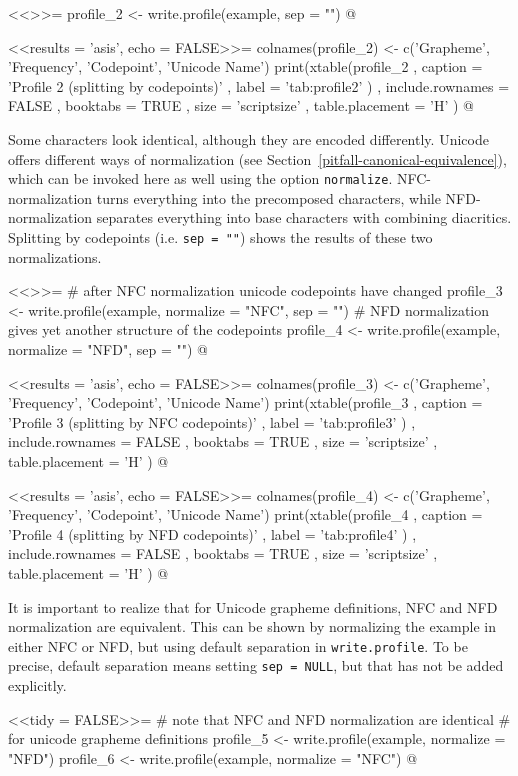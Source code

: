 <<>>=
profile_2 <- write.profile(example, sep = "")
@

<<results = 'asis', echo = FALSE>>=
colnames(profile_2) <- c('Grapheme', 'Frequency', 'Codepoint', 'Unicode Name')
print(xtable(profile_2
        , caption = 'Profile 2 (splitting by codepoints)'
        , label = 'tab:profile2'
        )
  , include.rownames = FALSE
  , booktabs = TRUE
  , size = 'scriptsize'
  , table.placement = 'H'
  )
@

Some characters look identical, although they are encoded differently.
Unicode offers different ways of normalization (see
Section~\ref{pitfall-canonical-equivalence}), which can be invoked here as well
using the option \texttt{normalize}. NFC-normalization turns everything into the
precomposed characters, while NFD-normalization separates everything into base
characters with combining diacritics. Splitting by codepoints (i.e. \texttt{sep~=~""}) shows the results of these two normalizations.

<<>>=
# after NFC normalization unicode codepoints have changed
profile_3 <- write.profile(example, normalize = "NFC", sep = "")
# NFD normalization gives yet another structure of the codepoints
profile_4 <- write.profile(example, normalize = "NFD", sep = "")
@

<<results = 'asis', echo = FALSE>>=
colnames(profile_3) <- c('Grapheme', 'Frequency', 'Codepoint', 'Unicode Name')
print(xtable(profile_3
        , caption = 'Profile 3 (splitting by NFC codepoints)'
        , label = 'tab:profile3'
        )
  , include.rownames = FALSE
  , booktabs = TRUE
  , size = 'scriptsize'
  , table.placement = 'H'
  )
@

<<results = 'asis', echo = FALSE>>=
colnames(profile_4) <- c('Grapheme', 'Frequency', 'Codepoint', 'Unicode Name')
print(xtable(profile_4
        , caption = 'Profile 4 (splitting by NFD codepoints)'
        , label = 'tab:profile4'
        )
  , include.rownames = FALSE
  , booktabs = TRUE
  , size = 'scriptsize'
  , table.placement = 'H'
  )
@

It is important to realize that for Unicode grapheme definitions, NFC
and NFD normalization are equivalent. This can be shown by normalizing the
example in either NFC or NFD, but using default separation in
\texttt{write.profile}. To be precise, default separation means setting
\texttt{sep~=~NULL}, but that has not be added explicitly.

<<tidy = FALSE>>=
# note that NFC and NFD normalization are identical
# for unicode grapheme definitions
profile_5 <- write.profile(example, normalize = "NFD")
profile_6 <- write.profile(example, normalize = "NFC")
@

